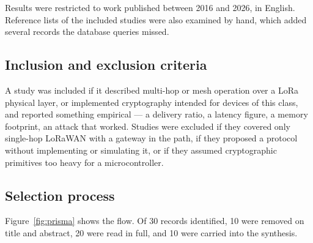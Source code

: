 \documentclass[conference]{IEEEtran}
\newcommand{\nIdentified}{30}      %
\newcommand{\nScreenExcluded}{10}  %
\newcommand{\nFullText}{20}        %
\newcommand{\nIncluded}{10}        %
\begin{document}
\noindent
Results were restricted to work published between 2016 and 2026, in English.
Reference lists of the included studies were also examined by hand, which added
several records the database queries missed.

\subsection{Inclusion and exclusion criteria}

A study was included if it described multi-hop or mesh operation over a LoRa
physical layer, or implemented cryptography intended for devices of this class,
and reported something empirical — a delivery ratio, a latency figure, a memory
footprint, an attack that worked. Studies were excluded if they covered only
single-hop LoRaWAN with a gateway in the path, if they proposed a protocol
without implementing or simulating it, or if they assumed cryptographic
primitives too heavy for a microcontroller.

\subsection{Selection process}

Figure~\ref{fig:prisma} shows the flow. Of \nIdentified{} records identified,
\nScreenExcluded{} were removed on title and abstract, \nFullText{} were read in
full, and \nIncluded{} were carried into the synthesis.
\end{document}
